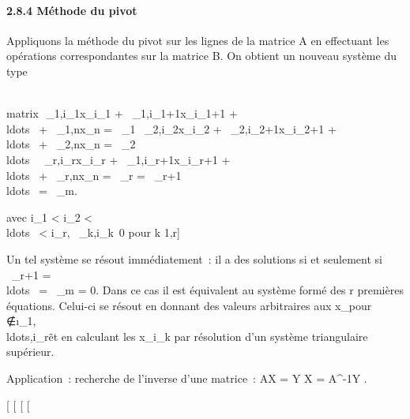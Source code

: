 \documentclass[]{article}
\begin{document}
\paragraph{2.8.4 Méthode du pivot}

Appliquons la méthode du pivot sur les lignes de la matrice A en
effectuant les opérations correspondantes sur la matrice B. On obtient
un nouveau système du type

\left
\\matrix\,\alpha~\_1,i\_1x\_i\_1
+ \alpha~\_1,i\_1+1x\_i\_1+1 +
\quad \quad
\\ldots~\quad
\quad + \alpha~\_1,nx\_n = \beta~\_1
\cr \alpha~\_2,i\_2x\_i\_2 +
\alpha~\_2,i\_2+1x\_i\_2+1 +
\quad
\\ldots~\quad
+ \alpha~\_2,nx\_n = \beta~\_2 \cr
\\ldots~
\cr \alpha~\_r,i\_rx\_i\_r +
\alpha~\_1,i\_r+1x\_i\_r+1 +
\\ldots~ +
\alpha~\_r,nx\_n = \beta~\_r  =
\beta~\_r+1 \cr
\\ldots~
 = \beta~\_m\right .

avec i\_1 \textless{} i\_2 \textless{}
\\ldots~ \textless{}
i\_r, \alpha~\_k,i\_k\neq~0
pour k \in {[}1,r{]}

Un tel système se résout immédiatement~: il a des solutions si et
seulement si \beta~\_r+1 =
\\ldots~ =
\beta~\_m = 0. Dans ce cas il est équivalent au système formé des r
premières équations. Celui-ci se résout en donnant des valeurs
arbitraires aux x\_\jmath pour
\jmath∉\i\_1,\\ldots,i\_r\~
et en calculant les x\_i\_k par résolution d'un système
triangulaire supérieur.

Application~: recherche de l'inverse d'une matrice~: AX = Y
\Leftrightarrow X = A^-1Y .

{[}
{[}
{[}
{[}
\end{document}
